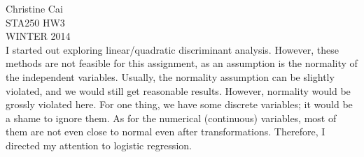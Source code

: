 \documentclass[12pt]{article}
\begin{document}
\noindent Christine Cai\\
STA250 HW3\\
WINTER 2014\\

I started out exploring linear/quadratic discriminant analysis. However, these methods are not feasible for this assignment, as an assumption is the normality of the independent variables. Usually, the normality assumption can be slightly violated, and we would still get reasonable results. However, normality would be grossly violated here. For one thing, we have some discrete variables; it would be a shame to ignore them. As for the numerical (continuous) variables, most of them are not even close to normal even after transformations. Therefore, I directed my attention to logistic regression.
\end{document}
